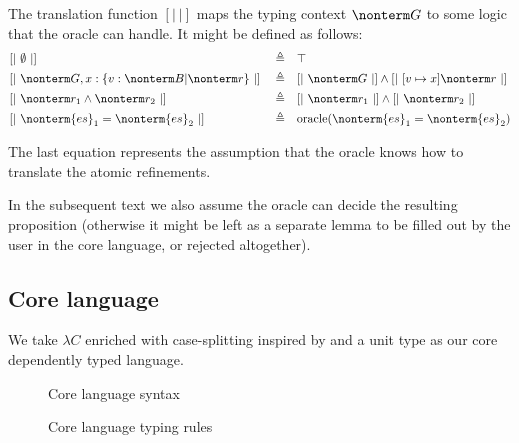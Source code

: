 \documentclass[a4paper]{article}
\begin{document}
The translation function $[|\ |]$ maps the typing context $\nonterm G$ to some logic
that the oracle can handle.
It might be defined as follows:
\begin{equation}
\begin{aligned}
  & [|\ \emptyset\ |]                                         && \triangleq && \top																						            \\
  & [|\ \nonterm G, x : \{ v : \nonterm B | \nonterm r \}\ |] && \triangleq && [|\ \nonterm G\ |] \land [|\ [ v \mapsto x ] \nonterm r\ |]  \\
  & [|\ \nonterm r_1 \land \nonterm r_2\ |]                   && \triangleq && [|\ \nonterm r_1\ |] \land [|\ \nonterm r_2\ |]              \\
  & [|\ \nonterm{es}_1 = \nonterm{es}_2\ |]                   && \triangleq && \text{oracle}(\nonterm{es}_1 = \nonterm{es}_2)             \\
\end{aligned}
\end{equation}

The last equation represents the assumption
that the oracle knows how to translate the atomic refinements.


In the subsequent text we also assume the oracle can decide the resulting proposition
(otherwise it might be left as a separate lemma to be filled out by the user in the core language, or rejected altogether).

\subsection{Core language}

We take $\lambda C$ \cite{Nederpelt14}
enriched with case-splitting inspired by \cite{TAPLVariants,EisenbergThesis}
and a unit type as our core dependently typed language.

\begin{figure}[ht]
  \footnotesize
  \caption{Core language syntax}
  \label{fig:core_syntax}
\end{figure}

\begin{figure}[ht]
  \footnotesize
  \caption{Core language typing rules}
  \label{fig:core_typing}
\end{figure}
\end{document}
